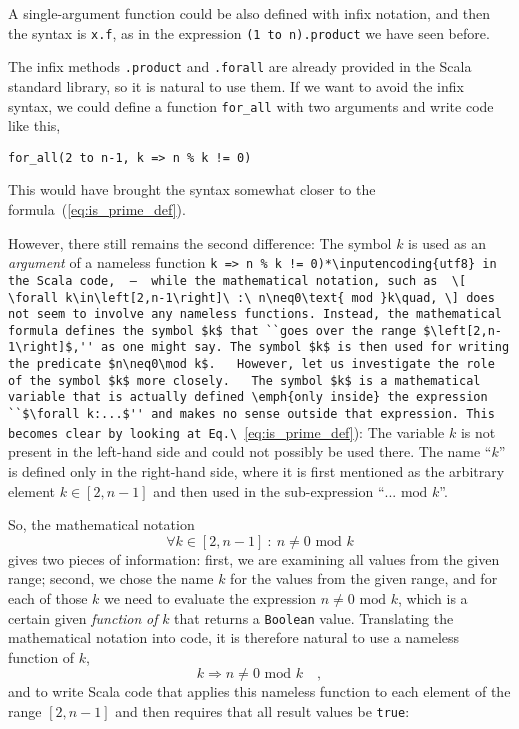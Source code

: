 A single-argument function could be also defined with infix notation,
and then the syntax is \lstinline!x.f!,
as in the expression \texttt{}\lstinline!(1 to n).product!
we have seen before.

The infix methods \texttt{}\lstinline!.product!
and \texttt{}\lstinline!.forall!
are already provided in the Scala standard library, so it is natural
to use them. If we want to avoid the infix syntax, we could define
a function \texttt{}\lstinline!for_all!
with two arguments and write code like this,

\begin{lstlisting}
for_all(2 to n-1, k => n % k != 0)
\end{lstlisting}
This would have brought the syntax somewhat closer to the formula\ (\ref{eq:is_prime_def}). 

However, there still remains the second difference: The symbol $k$
is used as an \emph{argument} of a nameless function \texttt{}\lstinline*(k => n % k != 0)*\inputencoding{utf8}
in the Scala code,  –  while the mathematical notation, such as 
\[
\forall k\in\left[2,n-1\right]\ :\ n\neq0\text{ mod }k\quad,
\]
does not seem to involve any nameless functions. Instead, the mathematical
formula defines the symbol $k$ that ``goes over the range $\left[2,n-1\right]$,''
as one might say. The symbol $k$ is then used for writing the predicate
$n\neq0\mod k$. 

However, let us investigate the role of the symbol $k$ more closely. 

The symbol $k$ is a mathematical variable that is actually defined
\emph{only inside} the expression ``$\forall k:...$'' and makes
no sense outside that expression. This becomes clear by looking at
Eq.\ (\ref{eq:is_prime_def}): The variable $k$ is not present in
the left-hand side and could not possibly be used there. The name
``$k$'' is defined only in the right-hand side, where it is first
mentioned as the arbitrary element $k\in\left[2,n-1\right]$ and then
used in the sub-expression ``$...\text{ mod }k$''.

So, the mathematical notation
\[
\forall k\in\left[2,n-1\right]\ :\ n\neq0\text{ mod }k
\]
gives two pieces of information: first, we are examining all values
from the given range; second, we chose the name $k$ for the values
from the given range, and for each of those $k$ we need to evaluate
the expression $n\neq0\text{ mod }k$, which is a certain given \emph{function}
\emph{of} $k$ that returns a \lstinline!Boolean!
value. Translating the mathematical notation into code, it is therefore
natural to use a nameless function of $k$,
\[
k\Rightarrow n\neq0\text{ mod }k\quad,
\]
and to write Scala code that applies this nameless function to each
element of the range $\left[2,n-1\right]$ and then requires that
all result values be \lstinline!true!:

